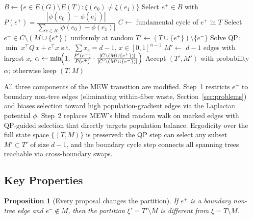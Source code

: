 \documentclass[11pt]{article}
\newtheorem{proposition}{Proposition}[section]
\begin{document}
\begin{algorithm}[H]
\caption{MEW with Boundary Cycle Step}\label{alg:boundary-cycle}
\BlankLine
{}
$B \gets \{e \in E(G) \setminus E(T) : \xi(e_0) \neq \xi(e_1)\}$\;
Select $e^+ \in B$ with $P(e^+) = \dfrac{|\phi(e^+_0) - \phi(e^+_1)|}
  {\sum_{e \in B} |\phi(e_0) - \phi(e_1)|}$\;
$C \gets$ fundamental cycle of $e^+$ in $T$\;
Select $e^- \in C \setminus (M \cup \{e^+\})$ uniformly at random\;
$T' \gets (T \cup \{e^+\}) \setminus \{e^-\}$\;
\BlankLine
{}
Solve QP: $\min\; x^\top Q\, x + c^\top x$ s.t.\
$\sum x_e = d-1$, $x \in [0,1]^{n-1}$\;
$M' \gets$ $d-1$ edges with largest $x_e$\;
\BlankLine
{}
$\alpha \gets \min\!\Bigl(1,\;
  \frac{P'(e^-)}{P(e^+)} \cdot
  \frac{|C \setminus (M \cup \{e^+\})|}{|C' \setminus (M' \cup \{e^-\})|}\Bigr)$\;
Accept $(T', M')$ with probability $\alpha$; otherwise keep $(T, M)$\;
\end{algorithm}

\medskip\noindent
All three components of the MEW transition are modified. Step~1 restricts
$e^+$ to boundary non-tree edges (eliminating within-fiber waste,
Section~\ref{sec:problems}) and biases selection toward high population-gradient
edges via the Laplacian potential $\phi$. Step~2 replaces MEW's blind random
walk on marked edges with QP-guided selection that directly targets population
balance.
Ergodicity over the full state space $\{(T, M)\}$ is preserved: the QP step
can select any subset $M' \subset T'$ of size $d - 1$, and the boundary cycle
step connects all spanning trees reachable via cross-boundary swaps.


\subsection{Key Properties}

\begin{proposition}[Every proposal changes the partition]\label{prop:no-waste}
If $e^+$ is a boundary non-tree edge and $e^- \notin M$, then the partition
$\xi' = T' \setminus M$ is different from $\xi = T \setminus M$.
\end{proposition}
\end{document}
